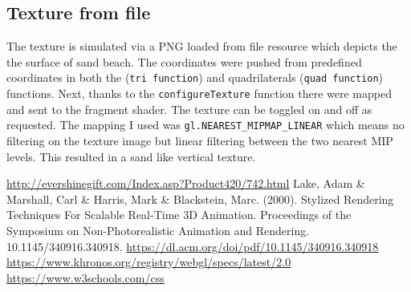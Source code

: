 \documentclass[12pt,a4paper]{article}
\begin{document}
\subsection{Texture from file}
The texture is simulated via a PNG loaded from file resource which depicts the the surface of sand beach. The coordinates were pushed from predefined coordinates in both the  (\texttt{tri function{}}) and quadrilaterals (\texttt{quad function{}}) functions. Next, thanks to the \texttt{configureTexture} function there were mapped and sent to the fragment shader. The texture can be toggled on and off as requested. The mapping I used was \texttt{gl.NEAREST\_MIPMAP\_LINEAR} which means no filtering on the texture image but linear filtering between the two nearest MIP levels. This resulted in a sand like vertical texture.


\begin{thebibliography}{1}

   \url{http://evershinegift.com/Index.asp?Product420/742.html}
 Lake, Adam \& Marshall, Carl \& Harris, Mark \& Blackstein, Marc. (2000). Stylized Rendering Techniques For Scalable Real-Time 3D Animation. Proceedings of the Symposium on Non-Photorealistic Animation and Rendering. 10.1145/340916.340918.  \url{https://dl.acm.org/doi/pdf/10.1145/340916.340918}
 \url{https://www.khronos.org/registry/webgl/specs/latest/2.0}
 \url{https://www.w3schools.com/css}

\end{thebibliography}
\end{document}
